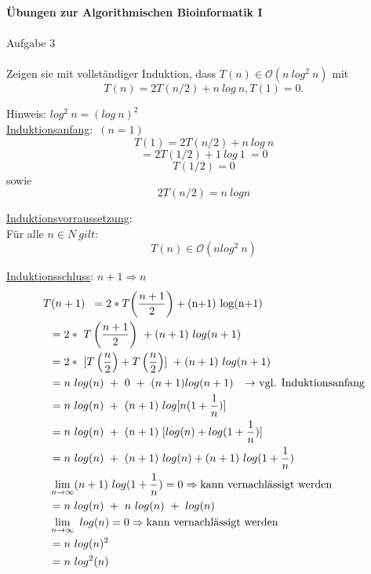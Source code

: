 \documentclass[11pt]{article}
\begin{document}
 
\textbf{Übungen zur Algorithmischen Bioinformatik I} \\\\
Aufgabe 3 \\\\
Zeigen sie mit vollständiger Induktion, 
dass  $T(n) \in \mathcal{O} (n \ log^2\ n)$ mit
\[ T(n) = 2T(n/2) + n \ log \ n, T(1) = 0.\]

Hinweis: $log^2\ n = (log\ n)^2$ \\

\underline{Induktionsanfang}:\ $(n = 1)$\\
\[ T(1) = 2T(n/2) + n \ log \ n \]
\[     = 2T(1/2) + 1 \ log \ 1 \ = 0 \]
\[     T(1/2)  = 0 \] sowie
\[     2T(n/2)  = n \ log n \]

\underline{Induktionsvorraussetzung}:\\
Für alle $n \in N \ gilt$: \[  T(n)\in \mathcal{O}(n log^2 \ n) \]

\underline{Induktionsschluss}: $n+1 \Rightarrow n$\\
\begin{align*}
   & T(n+1) \hspace{2mm} = 2 * T{\left(\frac{n+1}{2}\right)}+ \text{(n+1)  log(n+1)}\\ 
    &\hspace{2mm} =  2 * \ T\left(\frac{n+1}{2}\right) \ + (n+1)\ log(n+1)\\
    &\hspace{2mm} =  2 * \ [T\left(\frac{n}{2}\right) +                     T\left(\frac{n}{2}\right)] \ + (n+1)\ log(n+1)\\
    &\hspace{2mm} = n \ log (n)\ +\ 0\ +\ (n+1)log(n+1) 
                   \text{\ \ \  $\to $  vgl. Induktionsanfang}\\
    &\hspace{2mm} =  n \ log (n)\  +\ (n+1)\ log[n(1+\frac{1}{n})] \\
    &\hspace{2mm} =  n \ log (n)\  +\ (n+1)\ [log(n) + log(1+\frac{1}{n})]\\
    &\hspace{2mm} =  n \ log(n)\  +\ (n+1)\ log(n) +(n+1)\ log(1+\frac{1}{n})\\
    &\hspace{2mm} \lim \limits_{n \to \infty} (n+1) \ log(1+\frac{1}{n})=0 \Rightarrow \text{kann vernachlässigt werden }\\
    &\hspace{2mm} = n \ log (n)\  +\ n\ log(n)\ + \ log(n) \\
    &\hspace{2mm} \lim \limits_{n \to \infty}  \ log(n)=0
    \Rightarrow \text{kann vernachlässigt werden }\\
    &\hspace{2mm} = n \ log(n)^2 \\
    &\hspace{2mm} = n\ log^2(n)\\
\end{align*}
\end{document}
